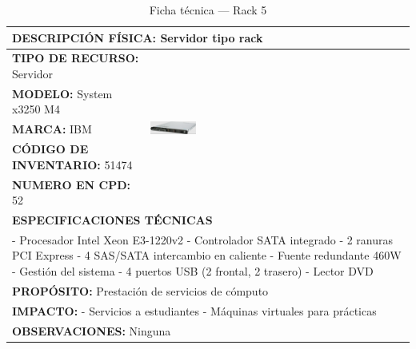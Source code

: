 \begin{table}[H]
\centering
\sffamily\scriptsize
\setlength{\tabcolsep}{3pt}
\renewcommand{\arraystretch}{1.1}
\caption{Ficha técnica --- Rack 5}\label{tab:rack-5}
\begin{tabular}{|p{}|p{}|}
\hline
\multicolumn{2}{|l|}{\textbf{DESCRIPCIÓN FÍSICA:} Servidor tipo rack} \\ \hline
\textbf{TIPO DE RECURSO:} Servidor & 
\multirow{5}{*}{\includegraphics[width=0.18\textwidth,keepaspectratio]{tablas-images/cp1/racks/rack-1.png}} \\ \cline{1-1}
\textbf{MODELO:} System x3250 M4 & \\ \cline{1-1}
\textbf{MARCA:} IBM & \\ \cline{1-1}
\textbf{CÓDIGO DE INVENTARIO:} 51474 & \\ \cline{1-1}
\textbf{NUMERO EN CPD:} 52 & \\ \hline
\multicolumn{2}{|l|}{\textbf{ESPECIFICACIONES TÉCNICAS}} \\ \hline
\multicolumn{2}{|p{0.7\textwidth}|}{
- Procesador Intel Xeon E3-1220v2
- Controlador SATA integrado
- 2 ranuras PCI Express
- 4 SAS/SATA intercambio en caliente
- Fuente redundante 460W
- Gestión del sistema
- 4 puertos USB (2 frontal, 2 trasero)
- Lector DVD
} \\ \hline
\multicolumn{2}{|l|}{\textbf{PROPÓSITO:} Prestación de servicios de cómputo} \\ \hline
\multicolumn{2}{|p{0.7\textwidth}|}{\textbf{IMPACTO:} 
- Servicios a estudiantes
- Máquinas virtuales para prácticas} \\ \hline
\multicolumn{2}{|p{0.7\textwidth}|}{\textbf{OBSERVACIONES:} Ninguna} \\ \hline
\end{tabular}
\end{table}

